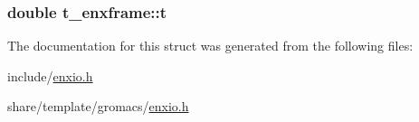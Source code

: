 \hypertarget{structt__enxframe_a2da3140116bb722748bd5bcdeb8b9aa9}{
\subsubsection[{t}]{\setlength{\rightskip}{0pt plus 5cm}double {\bf t\-\_\-enxframe\-::t}}}\label{structt__enxframe_a2da3140116bb722748bd5bcdeb8b9aa9}


\-The documentation for this struct was generated from the following files\-:\begin{DoxyCompactItemize}
\item 
include/\hyperlink{include_2enxio_8h}{enxio.\-h}\item 
share/template/gromacs/\hyperlink{share_2template_2gromacs_2enxio_8h}{enxio.\-h}\end{DoxyCompactItemize}
